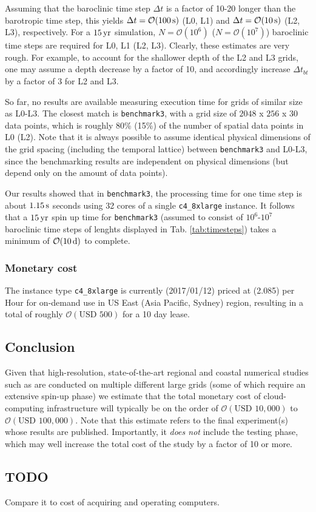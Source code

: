 \documentclass[12pt,a4paper]{article}
\begin{document}
Assuming that the baroclinic time step $\Delta t$ is a factor of 10-20 longer than the barotropic time step, this yields $\Delta t=\mathcal{O}(100\,\rm s)$ (L0, L1) and $\Delta t= \mathcal{O}(10\,\rm s)$ (L2, L3), respectively. For a $15\,\rm yr$ simulation, $N=\mathcal{O}(10^6)$ ($N=\mathcal{O}(10^7)$) baroclinic time steps are required for L0, L1 (L2, L3). Clearly, these estimates are very rough. For example, to account for the shallower depth of the L2 and L3 grids,  one may assume a depth decrease by a factor of 10, and accordingly increase $\Delta t_{bt}$ by a factor of 3 for L2 and L3. 

So far, no results are available measuring execution time for grids of similar size as L0-L3. The closest match is \verb|benchmark3|, with a grid size of $2048$ x $256$ x $30$ data points, which is roughly 80\% (15\%) of the number of spatial data points in L0 (L2). Note that it is always possible to assume identical physical dimensions of the grid spacing (including the temporal lattice) between \verb|benchmark3| and L0-L3, since the benchmarking results are independent on physical dimensions (but depend only on the amount of data points).

Our results showed that in \verb|benchmark3|, the processing time for one time step is about $1.15\,\rm s$ seconds using 32 cores of a single \verb|c4_8xlarge| instance. It follows that a $15\,\rm yr$ spin up time for \verb|benchmark3|  (assumed to consist of $10^6$-$10^7$ baroclinic time steps of lenghts displayed in Tab. \ref{tab:timesteps}) takes a minimum of $\mathcal{O}(10\,\rm d)$ to complete.

\subsubsection{Monetary cost}

The instance type \verb|c4_8xlarge| is currently (2017/01/12) priced at  (2.085) per Hour for on-demand use in US East (Asia Pacific, Sydney) region, resulting in a total of roughly $\mathcal{O}(\text{USD } 500)$ for a 10 day lease.



\subsection{Conclusion}

Given that high-resolution, state-of-the-art regional and coastal numerical studies such as  \cite{kumar2015midshelf} are conducted on multiple different large grids (some of which require an extensive spin-up phase) we estimate that the total monetary cost of cloud-computing infrastructure will typically be on the order of $\mathcal{O}(\text{USD } 10,000)$ to $\mathcal{O}(\text{USD } 100,000)$. Note that this estimate refers to the final experiment(s) whose results are published. Importantly, it \emph{does not} include the testing phase, which may well increase the total cost of the study by a factor of 10 or more. 

\subsection{TODO}

Compare it to cost of acquiring and operating computers.

	


\end{document}
